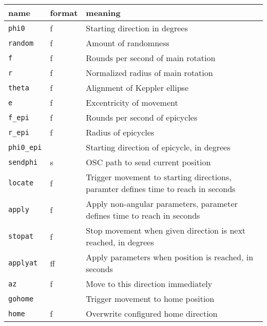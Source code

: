 \begin{tabularx}{\textwidth}{llX}
  {\bf name }     & {\bf format} & {\bf meaning}                                                                      \\
  \hline
  {\tt phi0}      & f            & Starting direction in degrees                                                      \\
  {\tt random}    & f            & Amount of randomness                                                               \\
  {\tt f}         & f            & Rounds per second of main rotation                                                 \\
  {\tt r}         & f            & Normalized radius of main rotation                                                 \\
  {\tt theta}     & f            & Alignment of Keppler ellipse                                                       \\
  {\tt e}         & f            & Excentricity of movement                                                           \\
  {\tt f\_epi}    & f            & Rounds per second of epicycles                                                     \\
  {\tt r\_epi}    & f            & Radius of epicycles                                                                \\
  {\tt phi0\_epi} &              & Starting direction of epicycle, in degrees                                         \\
  {\tt sendphi}   & s            & OSC path to send current position                                                  \\
  {\tt locate}    & f            & Trigger movement to starting directions, paramter defines time to reach in seconds \\
  {\tt apply}     & f            & Apply non-angular parameters, parameter defines time to reach in seconds           \\
  {\tt stopat}    & f            & Stop movement when given direction is next reached, in degrees                     \\
  {\tt applyat}   & ff           & Apply parameters when position is reached, in seconds                              \\
  {\tt az}        & f            & Move to this direction immediately                                                 \\
  {\tt gohome}    &              & Trigger movement to home position                                                  \\
  {\tt home}      & f            & Overwrite configured home direction                                                \\
\end{tabularx}


